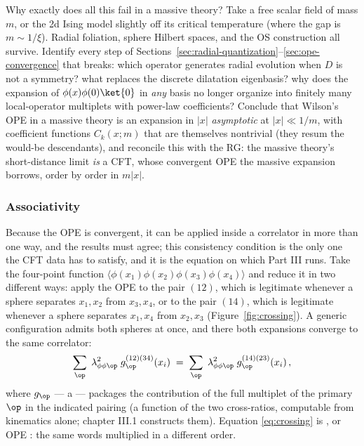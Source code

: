 \begin{exercise}[thinker]
\label{exr:ope-massive}
Why exactly does all this fail in a massive theory? Take a free scalar field
of mass $m$, or the 2d Ising model slightly off its critical temperature
(where the gap is $m \sim 1/\xi$). Radial foliation, sphere
Hilbert spaces, and the OS construction all survive. Identify every step of
Sections~\ref{sec:radial-quantization}--\ref{sec:ope-convergence} that breaks:
which operator generates radial evolution when $D$ is not a symmetry? what
replaces the discrete dilatation eigenbasis? why does the expansion of
$\phi(x)\phi(0)\ket{0}$ in \emph{any} basis no longer organize into finitely
many local-operator multiplets with power-law coefficients? Conclude that
Wilson's OPE in a massive theory is an expansion in $|x|$ \emph{asymptotic} at
$|x| \ll 1/m$, with coefficient functions $C_k(x; m)$ that are themselves
nontrivial (they resum the would-be descendants), and reconcile this with the
RG: the massive theory's short-distance limit \emph{is} a CFT, whose convergent
OPE the massive expansion borrows, order by order in $m|x|$.
\end{exercise}

\subsubsection{Associativity}
\label{sec:crossing}

Because the OPE is convergent, it can be applied inside a correlator in more
than one way, and the results must agree; this consistency condition is the
only one the CFT data has to satisfy, and it is the equation on which Part
III runs. Take the four-point function
$\langle\phi(x_1)\phi(x_2)\phi(x_3)\phi(x_4)\rangle$ and reduce it in two
different ways: apply the OPE to the pair $(12)$, which is legitimate
whenever a sphere separates $x_1, x_2$ from $x_3, x_4$, or to the pair
$(14)$, which is legitimate whenever a sphere separates $x_1, x_4$ from
$x_2, x_3$ (Figure~\ref{fig:crossing}). A generic configuration admits both
spheres at once, and there both expansions converge to the same correlator:
\begin{equation}
\sum_{\op}\; \lambda_{\phi\phi\op}^2 \;
g_{\op}^{(12)(34)}(x_i)
\;=\;
\sum_{\op}\; \lambda_{\phi\phi\op}^2\;
g_{\op}^{(14)(23)}(x_i)\,,
\label{eq:crossing}
\end{equation}
where $g_\op$ --- a  --- packages the contribution of
the full multiplet of the primary $\op$ in the indicated pairing (a function
of the two cross-ratios, computable from kinematics alone; chapter III.1
constructs them). Equation \eqref{eq:crossing} is ,
or OPE : the same words multiplied in a different order.

